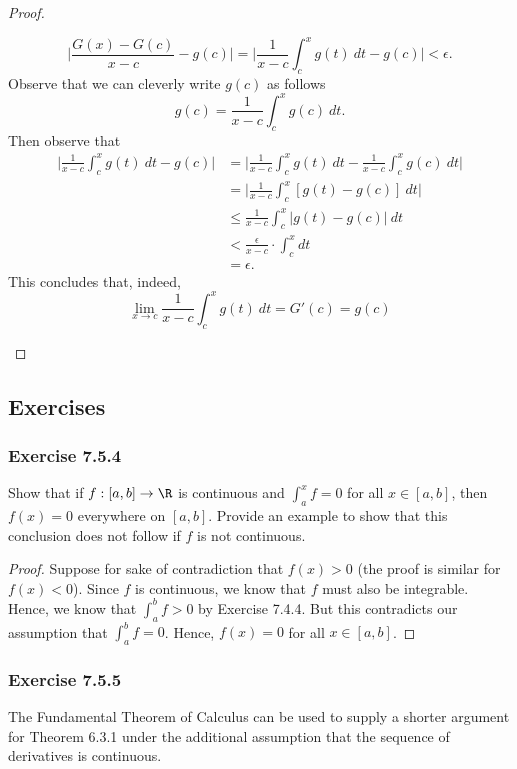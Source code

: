 \begin{proof}
\begin{enumerate}
		\[  \Big| \frac{ G(x) - G(c)  }{ x  -c  } - g(c)  \Big| = \Big| \frac{ 1 }{ x - c  } \int_{ c }^{ x } g(t) \ dt - g(c) \Big|  < \epsilon. \]
	Observe that we can cleverly write \( g(c)  \) as follows	
	\[  g(c) = \frac{ 1 }{ x -c  } \int_{ c }^{ x } g(c) \  dt. \] Then observe that 
	\begin{align*}
	    \Big| \frac{ 1 }{ x -c  } \int_{ c }^{ x } g(t) \  dt - g(c)  \Big| &= \Big| \frac{ 1 }{ x -c  } \int_{ c }^{ x } g(t)  \ dt - \frac{ 1 }{ x -c  } \int_{ c }^{ x } g(c) \   dt \Big|  \\
																			&= \Big| \frac{ 1 }{ x -c  } \int_{ c }^{ x } [ g(t) - g(c) ] \ dt \Big| \\
																			&\leq \frac{ 1 }{ x -c  } \int_{ c }^{ x } | g(t) - g(c) | \  dt \\
																			&< \frac{ \epsilon  }{ x- c  } \cdot \int_{ c }^{ x } dt  \\ 
																			&= \epsilon.
	\end{align*}
	This concludes that, indeed, 
	\[  \lim_{ x \to c } \frac{ 1 }{x -c  } \int_{ c }^{ x } g(t) \ dt = G'(c) = g(c) \]
\end{enumerate}
\end{proof}


\subsection{Exercises}


\subsubsection{Exercise 7.5.4} Show that if \( f: [a,b] \to \R  \) is continuous and \( \int_{ a }^{ x } f = 0   \) for all \( x \in [a,b]  \), then \( f(x) = 0  \) everywhere on \( [a,b]  \). Provide an example to show that this conclusion does not follow if \( f  \) is not continuous.
\begin{proof}
	Suppose for sake of contradiction that \( f(x) > 0  \) (the proof is similar for \( f(x) < 0  \)). Since \( f \) is continuous, we know that \( f  \) must also be integrable. Hence, we know that \( \int_{ a }^{ b } f   > 0  \) by Exercise 7.4.4. But this contradicts our assumption that \( \int_{ a }^{ b } f   = 0  \). Hence, \( f(x) = 0  \) for all \( x \in [a,b] \).
\end{proof}




\subsubsection{Exercise 7.5.5} The Fundamental Theorem of Calculus can be used to supply a shorter argument for Theorem 6.3.1 under the additional assumption that the sequence of derivatives is continuous.


